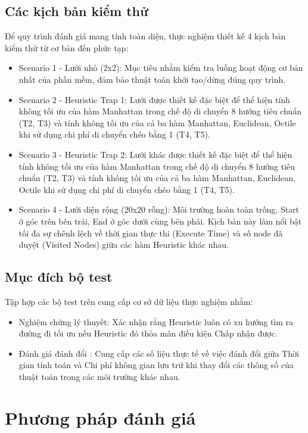 \documentclass[12pt,a4paper]{report}
\begin{document}
\subsection{Các kịch bản kiểm thử}
    Để quy trình đánh giá mang tính toàn diện, thực nghiệm thiết kế 4 kịch bản kiểm thử từ cơ bản đến phức tạp:

\begin{itemize}
    \item Scenario 1 - Lưới nhỏ (2x2): Mục tiêu nhằm kiểm tra luồng hoạt động cơ bản nhất của phần mềm, đảm bảo thuật toán khởi tạo/dừng đúng quy trình.
    \item Scenario 2 - Heuristic Trap 1: Lưới được thiết kế đặc biệt để thể hiện tính không tối ưu của hàm Manhattan trong chế độ di chuyển 8 hướng tiêu chuẩn (T2, T3) và tính không tối ưu của cả ba hàm Manhattan, Euclidean, Octile khi sử dụng chi phí di chuyển chéo bằng 1 (T4, T5).
    \item Scenario 3 - Heuristic Trap 2: Lưới khác được thiết kế đặc biệt để thể hiện tính không tối ưu của hàm Manhattan trong chế độ di chuyển 8 hướng tiêu chuẩn (T2, T3) và tính không tối ưu của cả ba hàm Manhattan, Euclidean, Octile khi sử dụng chi phí di chuyển chéo bằng 1 (T4, T5).
    \item Scenario 4 - Lưới diện rộng (20x20 rỗng): Môi trường hoàn toàn trống, Start ở góc trên bên trái, End ở góc dưới cùng bên phải. Kịch bản này làm nổi bật tối đa sự chênh lệch về thời gian thực thi (Execute Time) và số node đã duyệt (Visited Nodes) giữa các hàm Heuristic khác nhau.
\end{itemize}

\subsection{Mục đích bộ test}

Tập hợp các bộ test trên cung cấp cơ sở dữ liệu thực nghiệm nhằm:

\begin{itemize}
    \item Nghiệm chứng lý thuyết: Xác nhận rằng Heuristic luôn có xu hướng tìm ra đường đi tối ưu nếu Heuristic đó thỏa mãn điều kiện Chấp nhận được.
    \item Đánh giá đánh đổi : Cung cấp các số liệu thực tế về việc đánh đổi giữa Thời gian tính toán và Chi phí không gian lưu trữ khi thay đổi các thông số của thuật toán trong các môi trường khác nhau.
\end{itemize}

\section{Phương pháp đánh giá}
\end{document}
